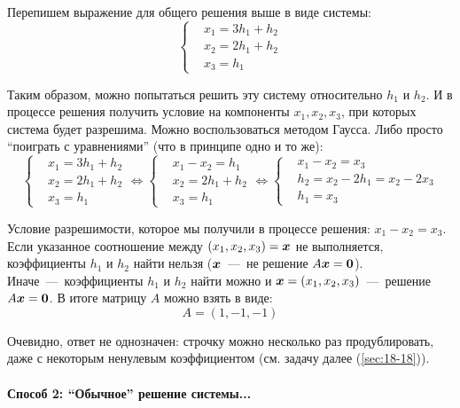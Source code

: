 \documentclass[a4paper,12pt]{article}
\begin{document}
\begin{solution}
    Перепишем выражение для общего решения выше в виде системы:
    \[
      \left\{
        \begin{aligned}
          &x_1 = 3h_1 + h_2\\
          &x_2 = 2h_1 + h_2\\
          &x_3 = h_1
        \end{aligned}
      \right.
    \]
    
    Таким образом, можно попытаться решить эту систему относительно $h_1$ и $h_2$.
    И в процессе решения получить условие на компоненты $x_1, x_2, x_3$, при которых система будет разрешима.
    Можно воспользоваться методом Гаусса.
    Либо просто ``поиграть с уравнениями'' (что в принципе одно и то же):
    \[
      \left\{
        \begin{aligned}
          &x_1 = 3h_1 + h_2\\
          &x_2 = 2h_1 + h_2\\
          &x_3 = h_1
        \end{aligned}
      \right. \Leftrightarrow \left\{
        \begin{aligned}
          &x_1 - x_2 = h_1\\
          &x_2 = 2h_1 + h_2\\
          &x_3 = h_1
        \end{aligned}
      \right. \Leftrightarrow \left\{
        \begin{aligned}
          &x_1 - x_2 = x_3\\
          &h_2 = x_2 - 2h_1 = x_2 - 2x_3\\
          &h_1 = x_3
        \end{aligned}
      \right.
    \]
    
    Условие разрешимости, которое мы получили в процессе решения: $\boxed{x_1 - x_2 = x_3}$.
    Если указанное соотношение между $(x_1, x_2, x_3) \hm= \bds x$ не выполняется, коэффициенты $h_1$ и $h_2$ найти нельзя ($\boldsymbol x$~---~не решение $A \bds x \hm= \bds 0$).
    Иначе~---~коэффициенты $h_1$ и $h_2$ найти можно и $\bds x \hm= (x_1, x_2, x_3)$~---~решение $A \bds x \hm= \bds 0$.
    В итоге матрицу $A$ можно взять в виде:
    \[
      A = (1, -1, -1)
    \]

    Очевидно, ответ не однозначен: строчку можно несколько раз продублировать, даже с некоторым ненулевым коэффициентом (см. задачу далее (\ref{sec:18-18})).
    
    \bigskip
    
    \paragraph{Способ 2: ``Обычное'' решение системы...}
    

\end{solution}
\end{document}
